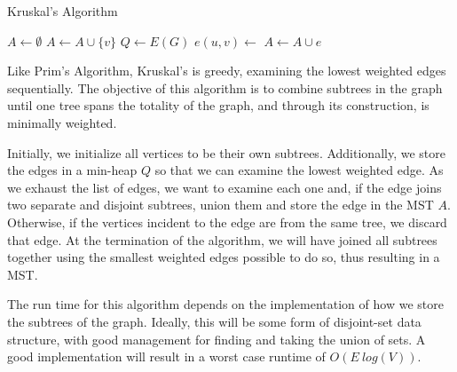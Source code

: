 \begin{algorithm}
    \DontPrintSemicolon
    \caption{Kruskal's Algorithm}


    $A \gets \emptyset$\;
     {
        $A \gets A \cup \{v\}$\;
    }
    $Q \gets E(G)$\;
     {
        $e(u, v) \gets$ \;
         {
            \;
            $A \gets A \cup e$\;
        }
    }
\end{algorithm}
Like Prim's Algorithm, Kruskal's is greedy, examining the lowest weighted edges sequentially. The objective of this algorithm is to combine subtrees in the graph until one tree spans the totality of the graph, and through its construction, is minimally weighted. 

Initially, we initialize all vertices to be their own subtrees. Additionally, we store the edges in a min-heap $Q$ so that we can examine the lowest weighted edge. As we exhaust the list of edges, we want to examine each one and, if the edge joins two separate and disjoint subtrees, union them and store the edge in the MST $A$. Otherwise, if the vertices incident to the edge are from the same tree, we discard that edge. At the termination of the algorithm, we will have joined all subtrees together using the smallest weighted edges possible to do so, thus resulting in a MST.

The run time for this algorithm depends on the implementation of how we store the subtrees of the graph. Ideally, this will be some form of disjoint-set data structure, with good management for finding and taking the union of sets. A good implementation will result in a worst case runtime of $O(E~log(V))$.

